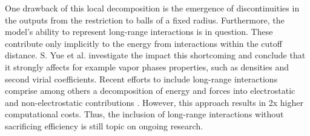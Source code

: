 One drawback of this local decomposition is the emergence of discontinuities in the outputs from the restriction to balls of a fixed radius. Furthermore,
the model's ability to represent long-range interactions is in question. These contribute only implicitly to the energy from interactions within the cutoff distance. S. Yue et al. \cite{article} investigate the impact this shortcoming and conclude that it strongly affects for example vapor phases properties, such as densities and second virial coefficients. Recent efforts to include long-range interactions comprise among others a decomposition of energy and forces into electrostatic and non-electrostatic contributions \cite{article}. However, this approach results in 2x higher computational costs. Thus, the inclusion of long-range interactions without sacrificing efficiency is still topic on ongoing research. 